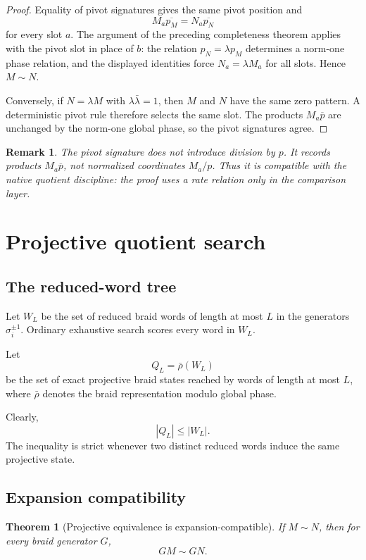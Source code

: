 \documentclass[11pt]{article}
\newtheorem{theorem}[definition]{Theorem}
\newtheorem{remark}[definition]{Remark}
\begin{document}
\begin{proof}
Equality of pivot signatures gives the same pivot position and
\[
    M_a\overline{p_M}=N_a\overline{p_N}
\]
for every slot $a$.  The argument of the preceding completeness theorem applies with the pivot slot in place of $b$: the relation $p_N=\lambda p_M$ determines a norm-one phase relation, and the displayed identities force $N_a=\lambda M_a$ for all slots.  Hence $M\sim N$.

Conversely, if $N=\lambda M$ with $\lambda\bar\lambda=1$, then $M$ and $N$ have the same zero pattern.  A deterministic pivot rule therefore selects the same slot.  The products $M_a\overline p$ are unchanged by the norm-one global phase, so the pivot signatures agree.
\end{proof}

\begin{remark}
The pivot signature does not introduce division by $p$.  It records products $M_a\overline p$, not normalized coordinates $M_a/p$.  Thus it is compatible with the native quotient discipline: the proof uses a rate relation only in the comparison layer.
\end{remark}

\section{Projective quotient search}

\subsection{The reduced-word tree}

Let $W_L$ be the set of reduced braid words of length at most $L$ in the generators $\sigma_i^{\pm1}$.  Ordinary exhaustive search scores every word in $W_L$.

Let
\[
    Q_L=\bar\rho(W_L)
\]
be the set of exact projective braid states reached by words of length at most $L$, where $\bar\rho$ denotes the braid representation modulo global phase.

Clearly,
\[
    |Q_L|\le |W_L|.
\]
The inequality is strict whenever two distinct reduced words induce the same projective state.

\subsection{Expansion compatibility}

\begin{theorem}[Projective equivalence is expansion-compatible]
If $M\sim N$, then for every braid generator $G$,
\[
    GM\sim GN.
\]
\end{theorem}
\end{document}
